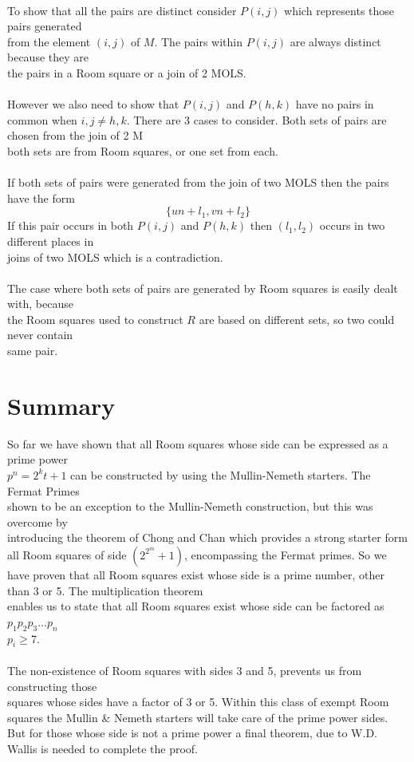 \documentclass[
  12pt,
  a4paper]{book}
\begin{document}
~\\
To show that all the pairs are distinct consider \(P(i,j)\) which
represents those pairs generated\\
from the element \((i,j)\) of \(M\). The pairs within \(P(i,j)\) are always
distinct because they are\\
the pairs in a Room square or a join of 2 MOLS.\\
~\\
However we also need to show that \(P(i,j)\) and \(P(h,k)\) have no pairs in
common when \(i,j \neq h,k\). There are 3 cases to consider. Both sets of
pairs are chosen from the join of 2 M\\
both sets are from Room squares, or one set from each.\\
~\\
If both sets of pairs were generated from the join of two MOLS then the
pairs have the form\[\{un+l_1,vn+l_2\}\] If this pair occurs in both
\(P(i,j)\) and \(P(h,k)\) then \((l_1,l_2)\) occurs in two different places
in\\
joins of two MOLS which is a contradiction.\\
~\\
The case where both sets of pairs are generated by Room squares is
easily dealt with, because\\
the Room squares used to construct \(R\) are based on different sets, so
two could never contain\\
same pair.

\hypertarget{summary}{%
\section{Summary}\label{summary}}

So far we have shown that all Room squares whose side can be expressed
as a prime power\\
\(p^n=2^kt+1\) can be constructed by using the Mullin-Nemeth starters. The
Fermat Primes\\
shown to be an exception to the Mullin-Nemeth construction, but this was
overcome by\\
introducing the theorem of Chong and Chan which provides a strong
starter form all Room squares of side \((2^{2^m}+1)\), encompassing the
Fermat primes. So we have proven that all Room squares exist whose side
is a prime number, other than 3 or 5. The multiplication theorem\\
enables us to state that all Room squares exist whose side can be
factored as \(p_1p_2p_3...p_n\)\\
\(p_i \geq 7\).\\
~\\
The non-existence of Room squares with sides 3 and 5, prevents us from
constructing those\\
squares whose sides have a factor of 3 or 5. Within this class of exempt
Room squares the Mullin \& Nemeth starters will take care of the prime
power sides. But for those whose side is not a prime power a final
theorem, due to W.D. Wallis is needed to complete the proof.
\end{document}
